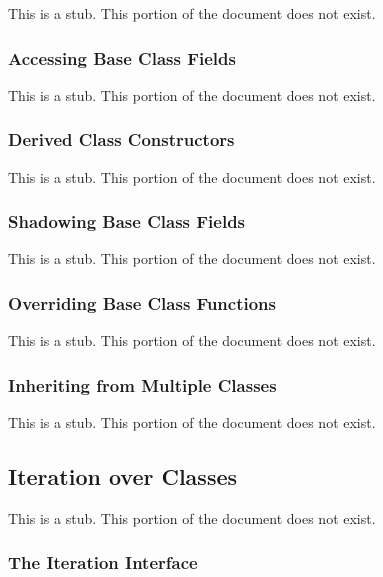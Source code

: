 This is a stub.  This portion of the document does not exist.

\subsubsection{Accessing Base Class Fields}
\label{Accessing_Base_Class_Fields}

This is a stub.  This portion of the document does not exist.

\subsubsection{Derived Class Constructors}
\label{Derived_Class_Constructors}

This is a stub.  This portion of the document does not exist.

\subsubsection{Shadowing Base Class Fields}
\label{Shadowing_Base_Class_Fields}

This is a stub.  This portion of the document does not exist.

\subsubsection{Overriding Base Class Functions}
\label{Overriding_Base_Class_Functions}

This is a stub.  This portion of the document does not exist.

\subsubsection{Inheriting from Multiple Classes}
\label{Inheriting_from_Multiple_Classes}

This is a stub.  This portion of the document does not exist.

\subsection{Iteration over Classes}
\label{Iteration_over_Classes}

This is a stub.  This portion of the document does not exist.

\subsubsection{The Iteration Interface}
\label{The_Iteration_Interface}

